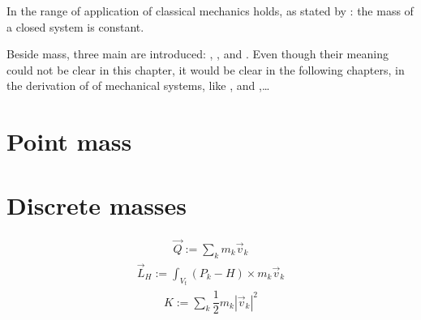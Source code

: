 \documentclass[letterpaper,10pt,english]{jupyterBook}
\begin{document}
\sphinxAtStartPar
In the range of application of classical mechanics  holds, as stated by : the mass of a closed system is constant.

\sphinxAtStartPar
Beside mass, three main  are introduced: , , and . Even though their meaning could not be clear in this chapter, it would be clear in the following chapters, in the derivation of {\hyperref[\detokenize{ch/dynamics-eom:classical-mechanics-dynamics-eom-eom}]{}} of mechanical systems, like {\hyperref[\detokenize{ch/dynamics-eom-point:classical-mechanics-dynamics-eom-point}]{}}, {\hyperref[\detokenize{ch/dynamics-eom-points:classical-mechanics-dynamics-eom-points}]{}} and {\hyperref[\detokenize{ch/dynamics-eom-rigid:classical-mechanics-dynamics-eom-rigid}]{}},…


\section{Point mass}
\label{\detokenize{ch/inertia:point-mass}}

\section{Discrete masses}
\label{\detokenize{ch/inertia:discrete-masses}}
\sphinxAtStartPar
{}
\begin{equation*}
\begin{split}\vec{Q} := \sum_k m_k \vec{v}_k \end{split}
\end{equation*}
\sphinxAtStartPar
{}
\begin{equation*}
\begin{split}\vec{L}_H := \int_{V_t} (P_k - H) \times m_k \vec{v}_k \end{split}
\end{equation*}
\sphinxAtStartPar
{}
\begin{equation*}
\begin{split}K := \sum_k \dfrac{1}{2} m_k |\vec{v}_k|^2\end{split}
\end{equation*}
\end{document}
